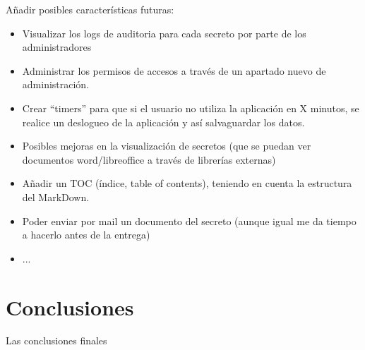 \documentclass{\ClassPath/viu-tfm-template}
\begin{document}
{\color{red} Añadir posibles características futuras:

    \begin{itemize}
        \item Visualizar los logs de auditoria para cada secreto por parte de los administradores
        \item Administrar los permisos de accesos a través de un apartado nuevo de administración.
        \item Crear “timers” para que si el usuario no utiliza la aplicación en X minutos, se realice un deslogueo de la aplicación y así salvaguardar los datos.
        \item Posibles mejoras en la visualización de secretos (que se puedan ver documentos word/libreoffice a través de librerías externas)
        \item Añadir un TOC (índice, table of contents), teniendo en cuenta la estructura del MarkDown.
        \item Poder enviar por mail un documento del secreto (aunque igual me da tiempo a hacerlo antes de la entrega)
        \item ...
    \end{itemize}
}



\chapter{Conclusiones}
{\color{red} Las conclusiones finales}

\vfill

\pagebreak
\printbibliography[title={Referencias bibliográficas},heading=bibintoc]
\pagebreak

{
    \hypersetup{linkcolor = black}
    \listoffigures
}
\end{document}

